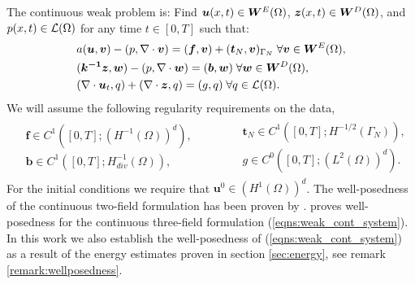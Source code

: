 The continuous weak problem is: Find $\boldsymbol{u}(x,t) \in \boldsymbol{W}^{E}(\Omega)$, $\boldsymbol{z}(x,t) \in \boldsymbol{W}^{D}(\Omega)$, and $p(x,t) \in \mathcal{L}(\Omega)$ for any time $t\in[0,T]$ such that:
\begin{subequations}
\label{eqns:weak_cont_system}
\begin{align}
& a(\boldsymbol{u},\boldsymbol{v}) - (p,\nabla \cdot \boldsymbol{v})=(\boldsymbol{f},\boldsymbol{v}) + (\boldsymbol{t}_{N},\boldsymbol{v})_{\Gamma_{N}} \; \forall \boldsymbol{v}\in \boldsymbol{W}^{E}(\Omega),
\label{eqn:weak_cont_elast_mom} \\
&(\boldsymbol{k^{-1}} \boldsymbol{z},\boldsymbol{w}) - (p,\nabla \cdot \boldsymbol{w}) = (\boldsymbol{b},\boldsymbol{w})
\; \forall\boldsymbol{w}\in \boldsymbol{W}^{D}(\Omega),
\label{eqn:weak_cont_flux_mom} \\
&(\nabla \cdot  {{\boldsymbol{u}_{t}}},{q}) + (\nabla \cdot \boldsymbol{z},{q}) = (g,{q}) \; \forall{q}\in \mathcal{L}(\Omega). \label{eqn:weak_cont_mass}
\end{align}
\end{subequations}
We will assume the following regularity requirements on the data,
\begin{equation}
\label{eqns:weak_cont_system_data}
\begin{gathered}\begin{aligned}
&\mathbf{f}\in C^{1}([0,T]; (H^{-1}(\Omega))^{d}),  \\
&\mathbf{b}\in C^{1}([0,T]; H_{div}^{-1}(\Omega)),
\end{aligned}\end{gathered}
\qquad
\begin{gathered}\begin{aligned}
&\mathbf{t}_{N}\in C^{1}([0,T]; H^{-1/2}(\Gamma_{N})), \\
&g\in C^{0}([0,T]; (L^{2}(\Omega))^{d}).
\end{aligned}\end{gathered}
\end{equation}
For the initial conditions we require that $\mathbf{u}^{0} \in  (H^{1}(\Omega))^{d}$.
{The well-posedness of the continuous two-field formulation has been proven by \cite{showalter2000diffusion}. \cite{lipnikov2002numerical} proves well-posedness for the continuous three-field formulation (\ref{eqns:weak_cont_system}). In this work we also establish the well-posedness of (\ref{eqns:weak_cont_system}) as a result of the energy estimates proven in section \ref{sec:energy}, see remark \ref{remark:wellposedness}.}

